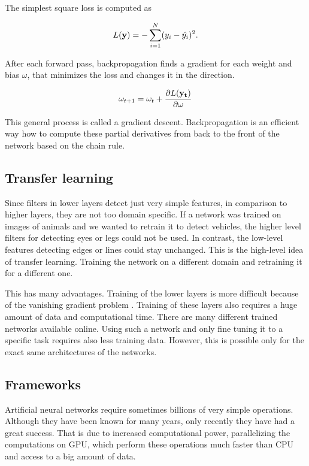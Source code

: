 \documentclass[a4paper,11pt,titlepage,twoside]{article}
\numberwithin{figure}{section}
\begin{document}
The simplest square loss is computed as 

\begin{equation}
 L(\bold{y}) = - \sum_{i=1}^N(y_i -  \hat{y_i})^2.
\end{equation} 

After each forward pass, backpropagation finds a gradient for each weight and bias $\omega$, that minimizes the loss and changes it in the direction. 

\begin{equation}
\omega_{t + 1} = \omega_{t} + \frac{\partial L(\bold{y_t})}{\partial \omega}
\end{equation}

This general process is called a gradient descent. Backpropagation is an efficient way how to compute these partial derivatives from back to the front of the network based on the chain rule.

\subsection{Transfer learning}

Since filters in lower layers detect just very simple features, in comparison to higher layers, they are not too domain specific. If a network was trained on images of animals and we wanted to retrain it to detect vehicles, the higher level filters for detecting eyes or legs could not be used. In contrast, the low-level features detecting edges or lines could stay unchanged. This is the high-level idea of transfer learning. Training the network on a different domain and retraining it for a different one. 

This has many advantages. Training of the lower layers is more difficult because of the vanishing gradient problem \cite{hochreiter1998vanishing}. Training of these layers also requires a huge amount of data and computational time. There are many different trained networks available online. Using such a network and only fine tuning it \cite{hinton2006reducing} to a specific task requires also less training data. However, this is possible only for the exact same architectures of the networks.

\subsection{Frameworks}
Artificial neural networks require sometimes billions of very simple operations. Although they have been known for many years\cite{widrow199030}, only recently they have had a great success. That is due to increased computational power, parallelizing the computations on GPU, which perform these operations much faster than CPU and access to a big amount of data. 
\end{document}
